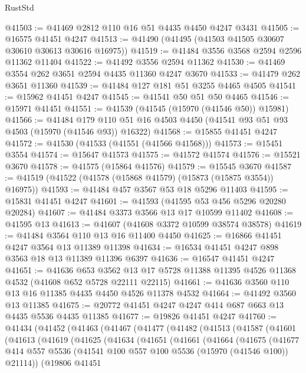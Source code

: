 \begin{lexlean}{RustStd}
\begin{coremodule}
@41503 := @41469 @2812 @110 @16 @51 @4435 @4450 @4247 @3431
@41505 := @16575 @41451 @4247
@41513 := @41490 (@41495 (@41503 @41505 @30607 @30610 @30613 @30616 @16975))
@41519 := @41484 @3556 @3568 @2594 @2596 @11362 @11404
@41522 := @41492 @3556 @2594 @11362
@41530 := @41469 @3554 @262 @3651 @2594 @4435 @11360 @4247 @3670
@41533 := @41479 @262 @3651 @11360
@41539 := @41484 @127 @181 @51 @3255 @4465 @4505
@41541 := @15962 @41451 @4247
@41545 := @41541 @50 @51 @50 @4465
@41546 := @15971 @41451
@41551 := @41539 (@41545 (@15970 (@41546 @50)) @15981)
@41566 := @41484
    @179
    @110
    @51
    @16
    @4503
    @4450
    (@41541 @93 @51 @93 @4503 (@15970 (@41546 @93)) @16322)
@41568 := @15855 @41451 @4247
@41572 := @41530 (@41533 (@41551 (@41566 @41568)))
@41573 := @15451 @3554
@41574 := @15647 @41573
@41575 := @41572 @41574
@41576 := @15521 @3670
@41578 := @41575 (@15864 @41576)
@41579 := @15545 @3670
@41587 := @41519 (@41522 (@41578 (@15868 @41579) (@15873 (@15875 @3554)) @16975))
@41593 := @41484 @457 @3567 @53 @18 @5296 @11403
@41595 := @15831 @41451 @4247
@41601 := @41593 (@41595 @53 @456 @5296 @20280 @20284)
@41607 := @41484 @3373 @3566 @13 @17 @10599 @11402
@41608 := @41595 @13
@41613 := @41607 (@41608 @3372 @10599 @38574 @38578)
@41619 := @41484 @3564 @110 @13 @16 @11400 @4450
@41625 := @16866 @41451 @4247 @3564 @13 @11389 @11398
@41634 := @16534 @41451 @4247 @898 @3563 @18 @13 @11389 @11396 @6397
@41636 := @16547 @41451 @4247
@41651 := @41636
    @653
    @3562
    @13
    @17
    @5728
    @11388
    @11395
    @4526
    @11368
    @4532
    (@41608 @652 @5728 @22111 @22115)
@41661 := @41636 @3560 @110 @13 @16 @11385 @4435 @4450 @4526 @11378 @4532
@41664 := @41492 @3560 @13 @11385
@41675 := @20772 @41451 @4247 @4247 @414 @687 @663 @13 @4435 @5536 @4435 @11385
@41677 := @19826 @41451 @4247
@41760 := @41434
    (@41452
      (@41463
        (@41467
          (@41477
            (@41482
              (@41513
                (@41587
                  (@41601
                    (@41613
                      (@41619
                        (@41625
                          (@41634
                            (@41651
                              (@41661
                                (@41664
                                  (@41675
                                    (@41677
                                      @414
                                      @557
                                      @5536
                                      (@41541 @100 @557 @100 @5536 (@15970 (@41546 @100)) @21114))
                                    (@19806
                                      @41451

\end{coremodule}
\end{lexlean}
